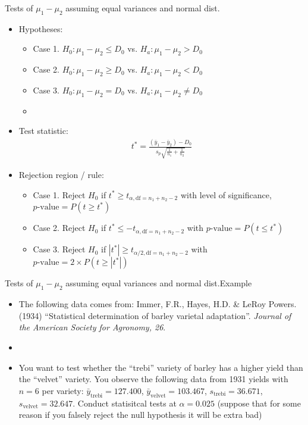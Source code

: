 \documentclass[xcolor=dvipsnames]{beamer}
\begin{document}
\begin{frame}{Tests of $\mu_1 - \mu_2$ assuming equal variances and normal dist.}
\begin{itemize}
	\item Hypotheses:
	\begin{itemize}
		\item Case 1. $H_0: \mu_1 - \mu_2 \leq D_0$ vs. $H_a: \mu_1 - \mu_2 > D_0$
		\item Case 2. $H_0: \mu_1 - \mu_2 \geq D_0$ vs. $H_a: \mu_1 - \mu_2 < D_0$
		\item Case 3. $H_0: \mu_1 - \mu_2 = D_0$ vs. $H_a: \mu_1 - \mu_2 \neq D_0$
		\item[]
	\end{itemize}
	
	\item Test statistic:
	\begin{align*}
	t^* = \frac{(\bar{y}_1-\bar{y}_2) - D_0}{s_p \sqrt{\frac{1}{n_1} + \frac{1}{n_2}}}
	\end{align*}
	
	\item Rejection region / rule: \pause
	\begin{itemize}
		\item Case 1. Reject $H_0$ if $t^* \geq t_{\alpha, \text{df} = n_1 + n_2 -2}$ with level of significance, $p\text{-value}=P(t \geq t^*)$ \pause
		\item Case 2. Reject $H_0$ if $t^* \leq -t_{\alpha, \text{df} = n_1 + n_2 -2}$ with $p\text{-value}=P(t \leq t^*)$ \pause
		\item Case 3. Reject $H_0$ if $|t^*| \geq t_{\alpha / 2, \text{df} = n_1 + n_2 -2}$ with $p\text{-value}=2 \times P(t \geq |t^*|)$
	\end{itemize}
\end{itemize}
\end{frame}

\begin{frame}{Tests of $\mu_1 - \mu_2$ assuming equal variances and normal dist.}{Example}
\begin{itemize}
	\item The following data comes from: Immer, F.R., Hayes, H.D. \& LeRoy Powers. (1934) ``Statistical determination of barley varietal adaptation''. \emph{Journal of the American Society for Agronomy, 26}. \pause
	\item[]
	\item You want to test whether the ``trebi'' variety of barley has a higher yield than the ``velvet'' variety. You observe the following data from 1931 yields with $n=6$ per variety: $\bar{y}_{\text{trebi}} = 127.400$, $\bar{y}_{\text{velvet}} = 103.467$, $s_{\text{trebi}} = 36.671$, $s_{\text{velvet}} = 32.647$. Conduct statisitcal tests at $\alpha = 0.025$ (suppose that for some reason if you falsely reject the null hypothesis it will be extra bad)
\end{itemize}
\end{frame}
\end{document}
